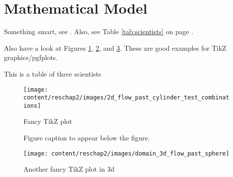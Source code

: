 \section{Mathematical Model}
Something smart, see \cite{EmmitBrown1947}. Also, see Table \ref{tab:scientists} on page \pageref{tab:scientists}.

Also have a look at Figures \ref{fig:test_combinations}, \ref{fig:some_results_plot}, and \ref{fig:3dgraphic}. These are good examples for TikZ graphics/pgfplots.

\begin{table}[h]
  \centering
  \caption{This is a table of three scientists}
  \label{tab:scientists}
\end{table}

\begin{figure}[p]
 \centering
 \texttt{[image: content/reschap2/images/2d\_flow\_past\_cylinder\_test\_combinations]}
 \caption{Fancy TikZ plot}
 \label{fig:test_combinations}
\end{figure}

\begin{figure}[p!]
 \centering
 \captionsetup[sub]{skip=0ex}
 \hfill
%
 \caption[Figure caption to appear in \textsl{List of Figures}]{Figure caption to appear below the figure.}
 \label{fig:some_results_plot}
\end{figure}

\begin{figure}[p]
 \centering
 \texttt{[image: content/reschap2/images/domain\_3d\_flow\_past\_sphere]}
 \caption{Another fancy TikZ plot in 3d}
 \label{fig:3dgraphic}
\end{figure}
